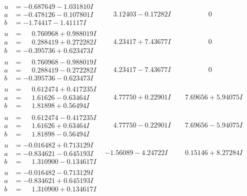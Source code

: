 \documentclass[1p]{elsarticle_modified}
\theoremstyle{definition}
\begin{document}
$$\begin{array}{c|c|c}
\begin{aligned}
u &= -0.687649 - 1.031810 I \\
a &= -0.478126 - 0.107801 I \\
b &= -1.74417 - 1.41117 I\end{aligned}
 & \phantom{-}3.12403 - 0.17282 I & \phantom{-0.000000 } 0 \\ \hline\begin{aligned}
u &= \phantom{-}0.760968 + 0.988019 I \\
a &= \phantom{-}0.288419 + 0.272282 I \\
b &= -0.395736 + 0.623473 I\end{aligned}
 & \phantom{-}4.23417 + 7.43677 I & \phantom{-0.000000 } 0 \\ \hline\begin{aligned}
u &= \phantom{-}0.760968 - 0.988019 I \\
a &= \phantom{-}0.288419 - 0.272282 I \\
b &= -0.395736 - 0.623473 I\end{aligned}
 & \phantom{-}4.23417 - 7.43677 I & \phantom{-0.000000 } 0 \\ \hline\begin{aligned}
u &= \phantom{-}0.612474 + 0.417235 I \\
a &= \phantom{-}1.61626 - 0.63464 I \\
b &= \phantom{-}1.81898 + 0.56494 I\end{aligned}
 & \phantom{-}4.77750 + 0.22901 I & \phantom{-}7.69656 + 5.94075 I \\ \hline\begin{aligned}
u &= \phantom{-}0.612474 - 0.417235 I \\
a &= \phantom{-}1.61626 + 0.63464 I \\
b &= \phantom{-}1.81898 - 0.56494 I\end{aligned}
 & \phantom{-}4.77750 - 0.22901 I & \phantom{-}7.69656 - 5.94075 I \\ \hline\begin{aligned}
u &= -0.016482 + 0.713129 I \\
a &= -0.834621 - 0.645193 I \\
b &= \phantom{-}1.310900 - 0.134617 I\end{aligned}
 & -1.56089 - 4.24722 I & \phantom{-}0.15146 + 8.27284 I \\ \hline\begin{aligned}
u &= -0.016482 - 0.713129 I \\
a &= -0.834621 + 0.645193 I \\
b &= \phantom{-}1.310900 + 0.134617 I\end{aligned}

\end{array}$$
\end{document}
